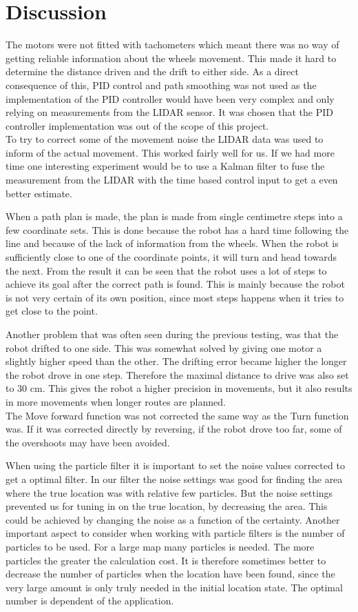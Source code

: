 \chapter{Discussion}

The motors were not fitted with tachometers which meant there was no way of getting reliable information about the wheels movement. This made it hard to determine the distance driven and the drift to either side. As a direct consequence of this, PID control and path smoothing was not used as the implementation of the PID controller would have been very complex and only relying on measurements from the LIDAR sensor. It was chosen that the PID controller implementation was out of the scope of this project. \\
To try to correct some of the movement noise the LIDAR data was used to inform of the actual movement. This worked fairly well for us. If we had more time one interesting experiment would be to use a Kalman filter to fuse the measurement from the LIDAR with the time based control input to get a even better estimate.

When a path plan is made, the plan is made from single centimetre steps into a  few coordinate sets. 
This is done because the robot has a hard time following the line and because of the lack of information from the wheels. 
When the robot is sufficiently close to one of the coordinate points, it will turn and head towards the next.
From the result it can be seen that the robot uses a lot of steps to achieve its goal after the correct path is found. 
This is mainly because the robot is not very certain of its own position, since most steps happens when it tries to get close to the point.

Another problem that was often seen during the previous testing, was that the robot drifted to one side. This was somewhat solved by giving one motor a slightly higher speed than the other. The drifting error became higher the longer the robot drove in one step. Therefore the maximal distance to drive was also set to 30 cm. This gives the robot a higher precision in movements, but it also results in more movements when longer routes are planned.\\
The Move forward function was not corrected the same way as the Turn function was. If it was corrected directly by reversing, if the robot drove too far, some of the overshoots may have been avoided.

When using the particle filter it is important to set the noise values corrected to get a optimal filter. In our filter the noise settings was good for finding the area where the true location was with relative few particles. But the noise settings prevented us for tuning in on the true location, by decreasing the area. This could be achieved by changing the noise as a function of the certainty.   
Another important aspect to consider when working with particle filters is the number of particles to be used. For a large map many particles is needed. The more particles the greater the calculation cost. It is therefore sometimes better to decrease the number of particles when the location have been found, since the very large amount is only truly needed in the initial location state. The optimal number is dependent of the application.

